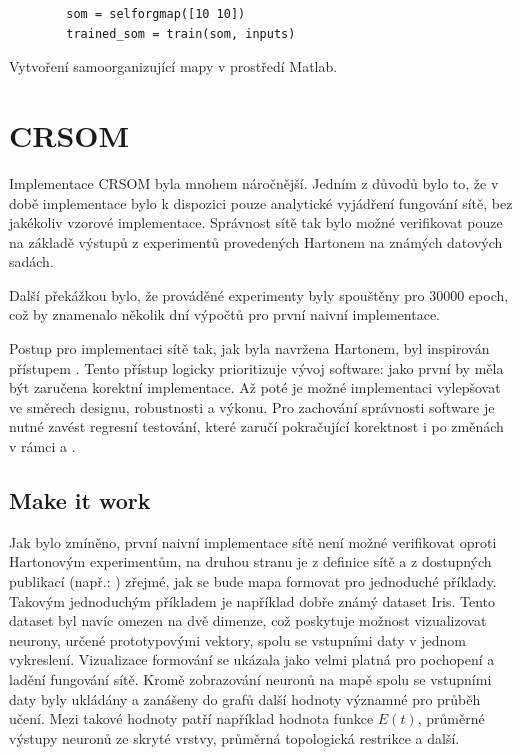 \documentclass[thesis=M,czech]{FITthesis}[2012/06/26]
\begin{document}
\begin{listing}
    \begin{verbatim}
        som = selforgmap([10 10])
        trained_som = train(som, inputs)
    \end{verbatim} 
    \caption{Vytvoření samoorganizující mapy v prostředí Matlab.} 
    \label{somcode}
\end{listing}

\section{CRSOM}\label{sec:crsom_impl}


Implementace CRSOM byla mnohem náročnější. Jedním z důvodů bylo to, že v době implementace bylo k dispozici pouze analytické vyjádření fungování sítě, bez jakékoliv vzorové implementace.
Správnost sítě tak bylo možné verifikovat pouze na základě výstupů z experimentů provedených Hartonem na známých datových sadách\cite{hartono14}.

Další překážkou bylo, že prováděné experimenty byly spouštěny pro $30 000$ epoch, což by znamenalo několik dní výpočtů pro první naivní implementace.
	
Postup pro implementaci sítě tak, jak byla navržena Hartonem, byl inspirován přístupem \textit{}\cite{makeit}. 
Tento přístup logicky prioritizuje vývoj software: jako první by měla být zaručena korektní implementace. Až poté je možné implementaci vylepšovat ve směrech designu, robustnosti a výkonu. Pro zachování správnosti software je nutné zavést regresní testování, které zaručí pokračující korektnost i po změnách v rámci  a .

\subsection{Make it work}
 Jak bylo zmíněno, první naivní implementace sítě není možné verifikovat oproti Hartonovým experimentům, na druhou stranu je z definice sítě a z dostupných publikací (např.: \cite{hartono14}) zřejmé, jak se bude mapa formovat pro jednoduché příklady. Takovým jednoduchým příkladem je například dobře známý dataset Iris. Tento dataset byl navíc omezen na dvě dimenze, což poskytuje možnost vizualizovat neurony, určené prototypovými vektory, spolu se vstupními daty v jednom vykreslení. Vizualizace formování se ukázala jako velmi platná pro pochopení a ladění fungování sítě. Kromě zobrazování neuronů na mapě spolu se vstupními daty byly ukládány a zanášeny do grafů další hodnoty významné pro průběh učení. Mezi takové hodnoty patří například hodnota funkce $E(t)$, průměrné výstupy neuronů ze skryté vrstvy, průměrná topologická restrikce a další.
 
\end{document}
